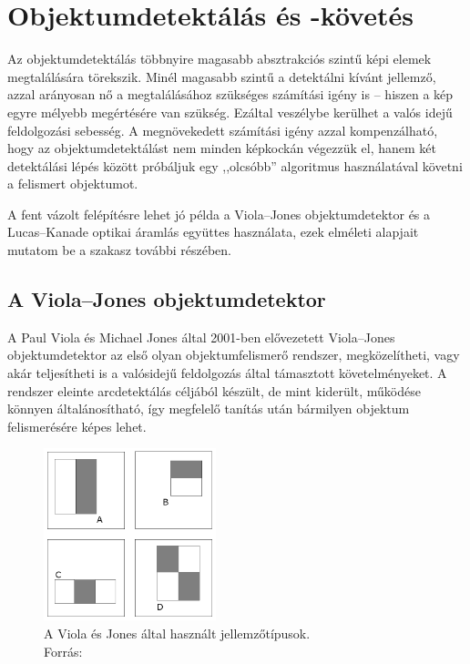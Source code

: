 \newpage
\section{Objektumdetektálás és -követés}\label{sect:objdetect}

Az objektumdetektálás többnyire magasabb absztrakciós szintű képi elemek megtalálására törekszik. Minél magasabb szintű a detektálni kívánt jellemző, azzal arányosan nő a megtalálásához szükséges számítási igény is -- hiszen a kép egyre mélyebb megértésére van szükség. Ezáltal veszélybe kerülhet a valós idejű feldolgozási sebesség. A megnövekedett számítási igény azzal kompenzálható, hogy az objektumdetektálást nem minden képkockán végezzük el, hanem két detektálási lépés között próbáljuk egy ,,olcsóbb'' algoritmus használatával követni a felismert objektumot.

A fent vázolt felépítésre lehet jó példa a Viola--Jones objektumdetektor és a Lucas--Kanade optikai áramlás együttes használata, ezek elméleti alapjait mutatom be a szakasz további részében.

\subsection{A Viola--Jones objektumdetektor}\label{sect:viola}

A Paul Viola és Michael Jones által 2001-ben elővezetett \cite{vj} Viola--Jones objektumdetektor az első olyan objektumfelismerő rendszer, megközelítheti, vagy akár teljesítheti is a valósidejű feldolgozás által támasztott követelményeket. A rendszer eleinte arcdetektálás céljából készült, de mint kiderült, működése könnyen általánosítható, így megfelelő tanítás után bármilyen objektum felismerésére képes lehet.

\begin{figure}[!ht]
\centering
\includegraphics[width=50mm, keepaspectratio]{figures/features.png}
\caption{A Viola és Jones által használt jellemzőtípusok.\\Forrás: \cite{vj}}
\label{fig:features}
\end{figure}


